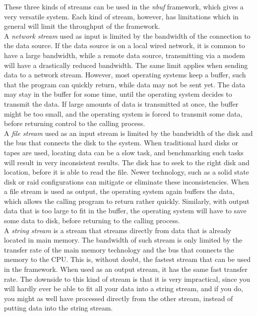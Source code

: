 \documentclass[a4paper]{article}
\newcommand{\nbuf}{\textit{nbuf} }
\begin{document}
These three kinds of streams can be used in the \nbuf framework, which gives a very versatile system. Each kind of stream, however, has limitations which in general will limit the throughput of the framework.\\

A \textit{network stream} used as input is limited by the bandwidth of the connection to the data source. If the data source is on a local wired network, it is common to have a large bandwidth, while a remote data source, transmitting via a modem will have a drastically reduced bandwidth. The same limit applies when sending data to a network stream. However, most operating systems keep a buffer, such that the program can quickly return, while data may not be sent yet. The data may stay in the buffer for some time, until the operating system decides to transmit the data. If large amounts of data is transmitted at once, the buffer might be too small, and the operating system is forced to transmit some data, before returning control to the calling process.\\

A \textit{file stream} used as an input stream is limited by the bandwidth of the disk and the bus that connects the disk to the system. When traditional hard disks or tapes are used, locating data can be a slow task, and benchmarking such tasks will result in very inconsistent results. The disk has to seek to the right disk and location, before it is able to read the file. Newer technology, such as a solid state disk or raid configurations can mitigate or eliminate these inconsistencies. When a file stream is used as output, the operating system again buffers the data, which allows the calling program to return rather quickly. Similarly, with output data that is too large to fit in the buffer, the operating system will have to save some data to disk, before returning to the calling process.\\

A \textit{string stream} is a stream that streams directly from data that is already located in main memory. The bandwidth of such stream is only limited by the transfer rate of the main memory technology and the bus that connects the memory to the CPU. This is, without doubt, the fastest stream that can be used in the framework. When used as an output stream, it has the same fast transfer rate. The downside to this kind of stream is that it is very impractical, since you will hardly ever be able to fit all your data into a string stream, and if you do, you might as well have processed directly from the other stream, instead of putting data into the string stream.\\
\end{document}
